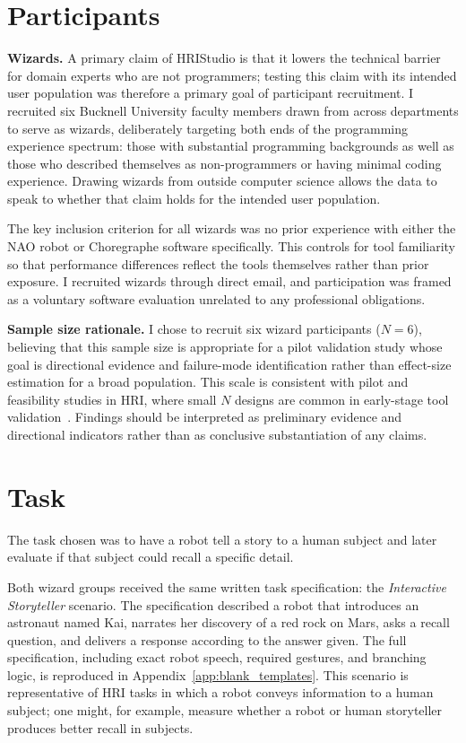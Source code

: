 \section{Participants}

\textbf{Wizards.} A primary claim of HRIStudio is that it lowers the technical barrier for domain experts who are not programmers; testing this claim with its intended user population was therefore a primary goal of participant recruitment. I recruited six Bucknell University faculty members drawn from across departments to serve as wizards, deliberately targeting both ends of the programming experience spectrum: those with substantial programming backgrounds as well as those who described themselves as non-programmers or having minimal coding experience. Drawing wizards from outside computer science allows the data to speak to whether that claim holds for the intended user population.

The key inclusion criterion for all wizards was no prior experience with either the NAO robot or Choregraphe software specifically. This controls for tool familiarity so that performance differences reflect the tools themselves rather than prior exposure. I recruited wizards through direct email, and participation was framed as a voluntary software evaluation unrelated to any professional obligations.

\textbf{Sample size rationale.} I chose to recruit six wizard participants ($N = 6$), believing that this sample size is appropriate for a pilot validation study whose goal is directional evidence and failure-mode identification rather than effect-size estimation for a broad population. This scale is consistent with pilot and feasibility studies in HRI, where small $N$ designs are common in early-stage tool validation~\cite{HoffmanZhao2021}. Findings should be interpreted as preliminary evidence and directional indicators rather than as conclusive substantiation of any claims.

\section{Task}

The task chosen was to have a robot tell a story to a human subject and later evaluate if that subject could recall a specific detail.

Both wizard groups received the same written task specification: the \emph{Interactive Storyteller} scenario. The specification described a robot that introduces an astronaut named Kai, narrates her discovery of a red rock on Mars, asks a recall question, and delivers a response according to the answer given. The full specification, including exact robot speech, required gestures, and branching logic, is reproduced in Appendix~\ref{app:blank_templates}. This scenario is representative of HRI tasks in which a robot conveys information to a human subject; one might, for example, measure whether a robot or human storyteller produces better recall in subjects.

